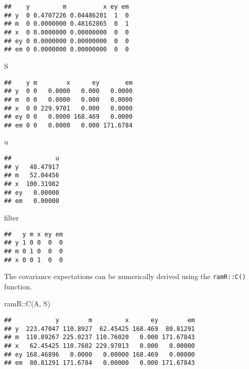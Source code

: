 \documentclass[
]{book}
\newenvironment{Shaded}{\begin{snugshade}}{\end{snugshade}}
\newcommand{\FunctionTok}[1]{\textcolor[rgb]{0.00,0.00,0.00}{#1}}
\newcommand{\NormalTok}[1]{#1}
\newcommand{\SpecialCharTok}[1]{\textcolor[rgb]{0.00,0.00,0.00}{#1}}
\theoremstyle{definition}
\theoremstyle{definition}
\theoremstyle{definition}
\theoremstyle{remark}
\begin{document}
\begin{verbatim}
##    y         m          x ey em
## y  0 0.4707226 0.04486201  1  0
## m  0 0.0000000 0.48162865  0  1
## x  0 0.0000000 0.00000000  0  0
## ey 0 0.0000000 0.00000000  0  0
## em 0 0.0000000 0.00000000  0  0
\end{verbatim}

\begin{Shaded}
\begin{Highlighting}[]
\NormalTok{S}
\end{Highlighting}
\end{Shaded}

\begin{verbatim}
##    y m        x      ey       em
## y  0 0   0.0000   0.000   0.0000
## m  0 0   0.0000   0.000   0.0000
## x  0 0 229.9701   0.000   0.0000
## ey 0 0   0.0000 168.469   0.0000
## em 0 0   0.0000   0.000 171.6784
\end{verbatim}

\begin{Shaded}
\begin{Highlighting}[]
\NormalTok{u}
\end{Highlighting}
\end{Shaded}

\begin{verbatim}
##            u
## y   48.47917
## m   52.04456
## x  100.31982
## ey   0.00000
## em   0.00000
\end{verbatim}

\begin{Shaded}
\begin{Highlighting}[]
\NormalTok{filter}
\end{Highlighting}
\end{Shaded}

\begin{verbatim}
##   y m x ey em
## y 1 0 0  0  0
## m 0 1 0  0  0
## x 0 0 1  0  0
\end{verbatim}

The covariance expectations
can be numerically derived using the \texttt{ramR::C()} function.

\begin{Shaded}
\begin{Highlighting}[]
\NormalTok{ramR}\SpecialCharTok{::}\FunctionTok{C}\NormalTok{(A, S)}
\end{Highlighting}
\end{Shaded}

\begin{verbatim}
##            y        m         x      ey        em
## y  223.47047 110.8927  62.45425 168.469  80.81291
## m  110.89267 225.0237 110.76020   0.000 171.67843
## x   62.45425 110.7602 229.97013   0.000   0.00000
## ey 168.46896   0.0000   0.00000 168.469   0.00000
## em  80.81291 171.6784   0.00000   0.000 171.67843
\end{verbatim}
\end{document}
